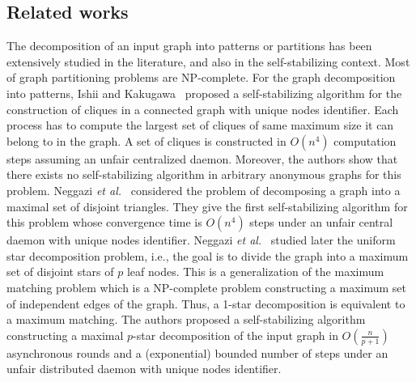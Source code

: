 \documentclass[11pt,letterpaper,onecolumn]{article}
\begin{document}
\subsection{Related works}

The decomposition of an input graph into patterns or partitions has been extensively studied in the literature, and also in the self-stabilizing context. Most of graph partitioning problems are NP-complete. For the graph decomposition into patterns, Ishii and Kakugawa~\cite{IshiiK02} proposed a self-stabilizing algorithm for the construction of cliques in a connected graph with unique nodes identifier. Each process has to compute the largest set of cliques of same maximum size it can belong to in the graph. A set of cliques is constructed in $O(n^4)$ computation steps assuming an unfair centralized daemon. Moreover, the authors show that there exists no self-stabilizing algorithm in arbitrary anonymous graphs for this problem. Neggazi \emph{et al.}~\cite{NeggaziHK12} considered the problem of decomposing a graph into a maximal set of disjoint triangles. They give the first self-stabilizing algorithm for this problem whose convergence time is $O(n^4)$ steps under an unfair central daemon with unique nodes identifier. Neggazi \emph{et al.}~\cite{NeggaziTHK13} studied later the uniform star decomposition problem, i.e., the goal is to divide the graph into a maximum set of disjoint stars of $p$ leaf nodes. This is a generalization of the maximum matching problem which is a NP-complete problem constructing a maximum set of independent edges of the graph. Thus, a 1-star decomposition is equivalent to a maximum matching. The authors proposed a self-stabilizing algorithm constructing a maximal $p$-star decomposition of the input graph in $O(\frac{n}{p+1})$ asynchronous rounds and a (exponential) bounded number of steps under an unfair distributed daemon with unique nodes identifier.\\
\end{document}
